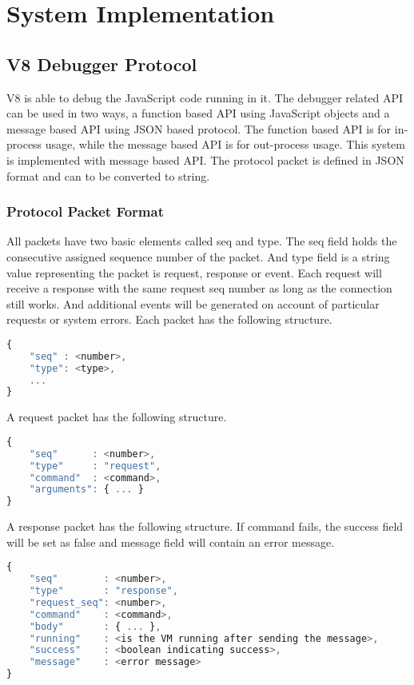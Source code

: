 \chapter {System Implementation}

\section {V8 Debugger Protocol}
V8 is able to debug the JavaScript code running in it. The debugger related API can be used in two ways, a function based API using JavaScript objects and a message based API using JSON based protocol. The function based API is for in-process usage, while the message based API is for out-process usage. This system is implemented with message based API. The protocol packet is defined in JSON format and can to be converted to string.

\subsection {Protocol Packet Format}
All packets have two basic elements called seq and type. The seq field holds the consecutive assigned sequence number of the packet. And type field is a string value representing the packet is request, response or event. Each request will receive a response with the same request seq number as long as the connection still works. And additional events will be generated on account of particular requests or system errors. Each packet has the following structure.

\begin{lstlisting}[language=JavaScript]
{
	"seq" : <number>,
	"type": <type>,
	...
}
\end{lstlisting}

A request packet has the following structure.

\begin{lstlisting}[language=JavaScript]
{
	"seq"      : <number>,
	"type"     : "request",
	"command"  : <command>,
	"arguments": { ... }
}
\end{lstlisting}

A response packet has the following structure. If command fails, the success field will be set as false and message field will contain an error message.

\begin{lstlisting}[language=JavaScript]
{
	"seq"        : <number>,
	"type"       : "response",
	"request_seq": <number>,
	"command"    : <command>,
	"body"       : { ... },
	"running"    : <is the VM running after sending the message>,
	"success"    : <boolean indicating success>,
	"message"    : <error message>
}
\end{lstlisting}

